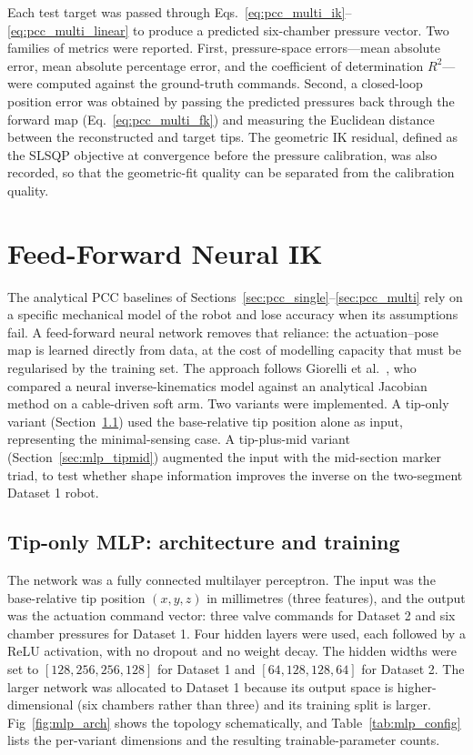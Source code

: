 Each test target was passed through Eqs.~\eqref{eq:pcc_multi_ik}--\eqref{eq:pcc_multi_linear} to produce a predicted six-chamber pressure vector. Two families of metrics were reported. First, pressure-space errors---mean absolute error, mean absolute percentage error, and the coefficient of determination $R^{2}$---were computed against the ground-truth commands. Second, a closed-loop position error was obtained by passing the predicted pressures back through the forward map (Eq.~\eqref{eq:pcc_multi_fk}) and measuring the Euclidean distance between the reconstructed and target tips. The geometric IK residual, defined as the SLSQP objective at convergence before the pressure calibration, was also recorded, so that the geometric-fit quality can be separated from the calibration quality.

\section{Feed-Forward Neural IK}
\label{sec:mlp}

The analytical PCC baselines of Sections~\ref{sec:pcc_single}--\ref{sec:pcc_multi} rely on a specific mechanical model of the robot and lose accuracy when its assumptions fail. A feed-forward neural network removes that reliance: the actuation--pose map is learned directly from data, at the cost of modelling capacity that must be regularised by the training set. The approach follows Giorelli et al.\ \cite{giorelli2015nn}, who compared a neural inverse-kinematics model against an analytical Jacobian method on a cable-driven soft arm. Two variants were implemented. A tip-only variant (Section~\ref{sec:mlp_tip}) used the base-relative tip position alone as input, representing the minimal-sensing case. A tip-plus-mid variant (Section~\ref{sec:mlp_tipmid}) augmented the input with the mid-section marker triad, to test whether shape information improves the inverse on the two-segment Dataset 1 robot.

\subsection{Tip-only MLP: architecture and training}
\label{sec:mlp_tip}

The network was a fully connected multilayer perceptron. The input was the base-relative tip position $(x, y, z)$ in millimetres (three features), and the output was the actuation command vector: three valve commands for Dataset 2 and six chamber pressures for Dataset 1. Four hidden layers were used, each followed by a ReLU activation, with no dropout and no weight decay. The hidden widths were set to $[128, 256, 256, 128]$ for Dataset 1 and $[64, 128, 128, 64]$ for Dataset 2. The larger network was allocated to Dataset 1 because its output space is higher-dimensional (six chambers rather than three) and its training split is larger. Fig~\ref{fig:mlp_arch} shows the topology schematically, and Table~\ref{tab:mlp_config} lists the per-variant dimensions and the resulting trainable-parameter counts.

